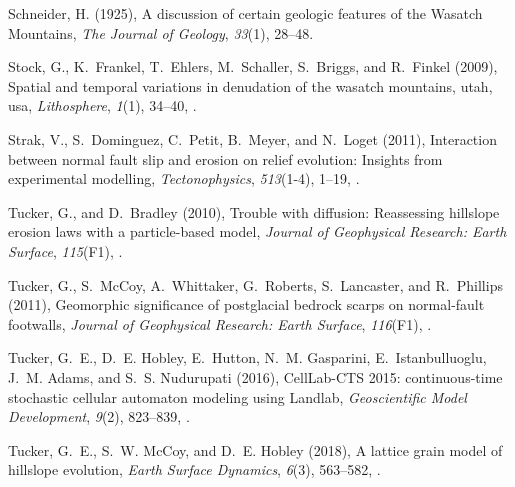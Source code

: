 \begin{thebibliography}{50}
Schneider, H. (1925), {A discussion of certain geologic features of the Wasatch
  Mountains}, \textit{The Journal of Geology}, \textit{33}(1), 28--48.

Stock, G., K.~Frankel, T.~Ehlers, M.~Schaller, S.~Briggs, and R.~Finkel (2009),
  Spatial and temporal variations in denudation of the wasatch mountains, utah,
  usa, \textit{Lithosphere}, \textit{1}(1), 34--40, .

Strak, V., S.~Dominguez, C.~Petit, B.~Meyer, and N.~Loget (2011), Interaction
  between normal fault slip and erosion on relief evolution: Insights from
  experimental modelling, \textit{Tectonophysics}, \textit{513}(1-4), 1--19,
  .

Tucker, G., and D.~Bradley (2010), {Trouble with diffusion: Reassessing
  hillslope erosion laws with a particle-based model}, \textit{Journal of
  Geophysical Research: Earth Surface}, \textit{115}(F1),
  .

Tucker, G., S.~McCoy, A.~Whittaker, G.~Roberts, S.~Lancaster, and R.~Phillips
  (2011), Geomorphic significance of postglacial bedrock scarps on normal-fault
  footwalls, \textit{Journal of Geophysical Research: Earth Surface},
  \textit{116}(F1), .

Tucker, G.~E., D.~E. Hobley, E.~Hutton, N.~M. Gasparini, E.~Istanbulluoglu,
  J.~M. Adams, and S.~S. Nudurupati (2016), {CellLab-CTS 2015: continuous-time
  stochastic cellular automaton modeling using Landlab}, \textit{Geoscientific
  Model Development}, \textit{9}(2), 823--839, .

Tucker, G.~E., S.~W. McCoy, and D.~E. Hobley (2018), A lattice grain model of
  hillslope evolution, \textit{Earth Surface Dynamics}, \textit{6}(3),
  563--582, .


\end{thebibliography}
